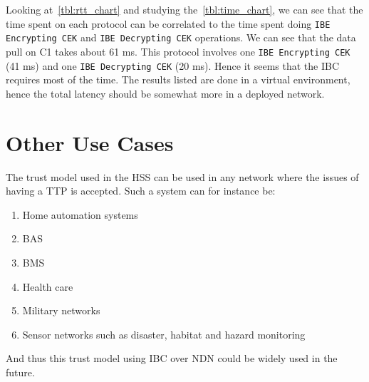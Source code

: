 Looking at~\autoref{tbl:rtt_chart} and studying the~\autoref{tbl:time_chart}, we can see that the time spent on each protocol can be correlated to the time spent doing \texttt{IBE Encrypting \gls{CEK}} and \texttt{IBE Decrypting \gls{CEK}} operations. 
We can see that the data pull on C1 takes about 61 ms.
This protocol involves one \texttt{IBE Encrypting \gls{CEK}} (41 ms) and one \texttt{IBE Decrypting \gls{CEK}} (20 ms). 
Hence it seems that the \gls{IBC} requires most of the time.
The results listed are done in a virtual environment, hence the total latency should be somewhat more in a deployed network.

\section{Other Use Cases}
The trust model used in the \gls{HSS} can be used in any network where the issues of having a \gls{TTP} is accepted. 
Such a system can for instance be:
\begin{enumerate}
	\item Home automation systems
	\item \gls{BAS}
	\item \gls{BMS}
	\item Health care
	\item Military networks
	\item Sensor networks such as disaster, habitat and hazard monitoring
\end{enumerate}

And thus this trust model using \gls{IBC} over \gls{NDN} could be widely used in the future.
